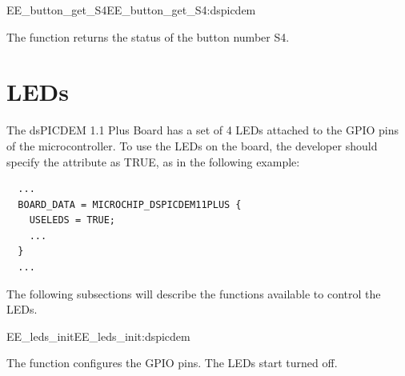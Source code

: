 \begin{function_nopb2}{EE\_button\_get\_S4}{EE_button_get_S4:dspicdem}
  
  \begin{fundescription}
    The function returns the status of the button number S4.
  \end{fundescription}
  
  
  \begin{funreturn}
  \end{funreturn}
  
\end{function_nopb2}





\section{LEDs}

The dsPICDEM 1.1 Plus Board has a set of 4 LEDs attached to the GPIO
pins of the microcontroller. To use the LEDs on the board,
the developer should specify the  attribute as TRUE, as
in the following example:

\begin{lstlisting}
  ...
  BOARD_DATA = MICROCHIP_DSPICDEM11PLUS {
    USELEDS = TRUE;
    ...
  }
  ...
\end{lstlisting}

The following subsections will describe the functions available to
control the LEDs.

\begin{function_nopb2}{EE\_leds\_init}{EE_leds_init:dspicdem}
  
  \begin{fundescription}
    The function configures the GPIO pins. The LEDs start turned off.
  \end{fundescription}
  
  
  
\end{function_nopb2}

